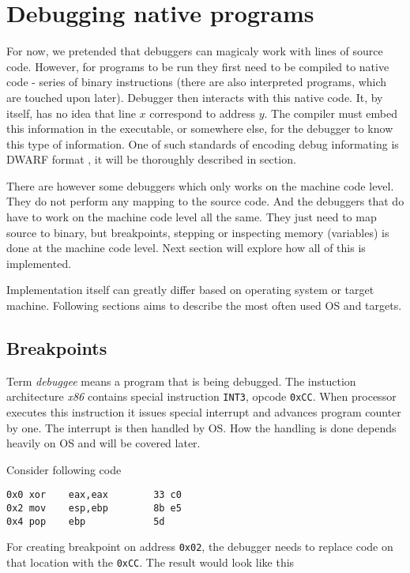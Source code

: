 \section{Debugging native programs}
For now, we pretended that debuggers can magicaly work with lines of source code. However, for programs to be run they first need to be compiled to native code - series of binary instructions (there are also interpreted programs, which are touched upon later). Debugger then interacts with this native code. It, by itself, has no idea that line $x$ correspond to address $y$. The compiler must embed this information in the executable, or somewhere else, for the debugger to know this type of information. One of such standards of encoding debug informating is DWARF format \cite{dwarf}, it will be thoroughly described in  section.  

There are however some debuggers which only works on the machine code level. They do not perform any mapping to the source code. And the debuggers that do have to work on the machine code level all the same. They just need to map source to binary, but breakpoints, stepping or inspecting memory (variables) is done at the machine code level. Next section will explore how all of this is implemented.

Implementation itself can greatly differ based on operating system or target machine. Following sections aims to describe the most often used OS and targets.

\subsection{Breakpoints}
Term \textit{debuggee} means a program that is being debugged. The instuction architecture \textit{x86} contains special instruction \lstinline{INT3}, opcode \lstinline{0xCC}. When processor executes this instruction it issues special interrupt and advances program counter by one. The interrupt is then handled by OS. How the handling is done depends heavily on OS and will be covered later. 

Consider following code
\begin{lstlisting}
0x0 xor    eax,eax        33 c0
0x2 mov    esp,ebp        8b e5
0x4 pop    ebp            5d
\end{lstlisting}

For creating breakpoint on address \lstinline{0x02}, the debugger needs to replace code on that location with the \lstinline{0xCC}. The result would look like this 

